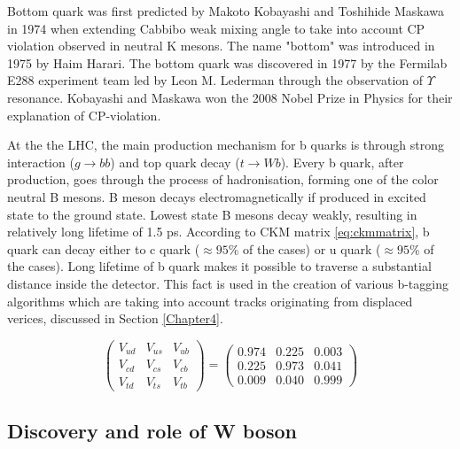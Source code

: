 Bottom quark was first predicted by Makoto Kobayashi and Toshihide Maskawa in 1974 when extending Cabbibo weak mixing angle to take into account CP violation observed in neutral K mesons. \cite{Kobayashi:1973fv} The name "bottom" was introduced in 1975 by Haim Harari. The bottom quark was discovered in 1977 by the Fermilab E288 experiment team led by Leon M. Lederman through the observation of $\Upsilon$ resonance. \cite{PhysRevLett.39.252} Kobayashi and Maskawa won the 2008 Nobel Prize in Physics for their explanation of CP-violation. 
\par At the the LHC, the main production mechanism for b quarks is through strong interaction ($g\rightarrow bb$) and top quark decay ($t\rightarrow Wb$). Every b quark, after production, goes through the process of hadronisation, forming one of the color neutral B mesons. B meson decays electromagnetically if produced in excited state to the ground state. Lowest state B mesons decay weakly, resulting in relatively long lifetime of 1.5 ps. According to CKM matrix \ref{eq:ckmmatrix}, b quark can decay either to c quark ($\approx 95\%$ of the cases) or u quark ($\approx 95\%$ of the cases). Long lifetime of b quark makes it possible to traverse a substantial distance inside the detector. This fact is used in the creation of various b-tagging algorithms which are taking into account tracks originating from displaced verices, discussed in Section 
\ref{Chapter4}.

\begin{equation} 
\begin{pmatrix}
V_{ud} & V_{us} & V_{ub} \\
V_{cd} & V_{cs} & V_{cb} \\
V_{td} & V_{ts} & V_{tb} 
\end{pmatrix} 
= \begin{pmatrix}
0.974 & 0.225 & 0.003 \\
0.225 & 0.973 & 0.041 \\
0.009 & 0.040 & 0.999 
\end{pmatrix} 
\label{eq:ckmmatrix} 
\end{equation}



\subsection{Discovery and role of W boson}

